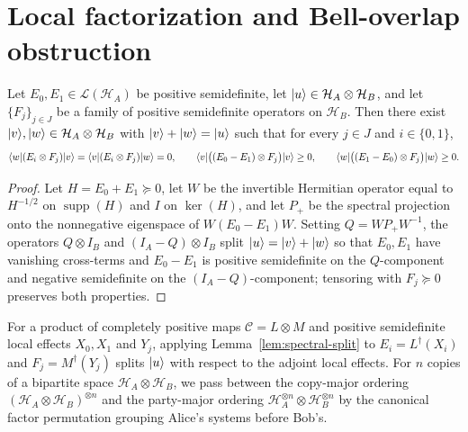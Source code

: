 \section{Local factorization and Bell-overlap obstruction}

\begin{lemma}
\label{lem:spectral-split}
\leanok
Let $E_0, E_1 \in \mathcal{L}(\mathcal{H}_A)$ be positive semidefinite, let $|u\rangle\in\mathcal{H}_A\otimes\mathcal{H}_B$, and let $\{F_j\}_{j\in J}$ be a family of positive semidefinite operators on $\mathcal{H}_B$. Then there exist $|v\rangle,|w\rangle\in\mathcal{H}_A\otimes\mathcal{H}_B$ with $|v\rangle+|w\rangle=|u\rangle$ such that for every $j\in J$ and $i\in\{0,1\}$,
\[
  \langle w|(E_i\otimes F_j)|v\rangle = \langle v|(E_i\otimes F_j)|w\rangle = 0, \qquad
  \langle v|\big((E_0-E_1)\otimes F_j\big)|v\rangle \ge 0, \qquad
  \langle w|\big((E_1-E_0)\otimes F_j\big)|w\rangle \ge 0.
\]
\end{lemma}
\begin{proof}
\leanok
Let $H = E_0 + E_1 \succeq 0$, let $W$ be the invertible Hermitian operator equal to $H^{-1/2}$ on $\operatorname{supp}(H)$ and $I$ on $\ker(H)$, and let $P_+$ be the spectral projection onto the nonnegative eigenspace of $W(E_0 - E_1)W$. Setting $Q = W P_+ W^{-1}$, the operators $Q\otimes I_B$ and $(I_A - Q)\otimes I_B$ split $|u\rangle = |v\rangle + |w\rangle$ so that $E_0, E_1$ have vanishing cross-terms and $E_0 - E_1$ is positive semidefinite on the $Q$-component and negative semidefinite on the $(I_A - Q)$-component; tensoring with $F_j\succeq 0$ preserves both properties.
\end{proof}

For a product of completely positive maps $\mathcal{C} = L\otimes M$ and positive semidefinite local effects $X_0, X_1$ and $Y_j$, applying Lemma~\ref{lem:spectral-split} to $E_i = L^{\dagger}(X_i)$ and $F_j = M^{\dagger}(Y_j)$ splits $|u\rangle$ with respect to the adjoint local effects. For $n$ copies of a bipartite space $\mathcal{H}_A\otimes\mathcal{H}_B$, we pass between the copy-major ordering $(\mathcal{H}_A\otimes\mathcal{H}_B)^{\otimes n}$ and the party-major ordering $\mathcal{H}_A^{\otimes n}\otimes\mathcal{H}_B^{\otimes n}$ by the canonical factor permutation grouping Alice's systems before Bob's.

